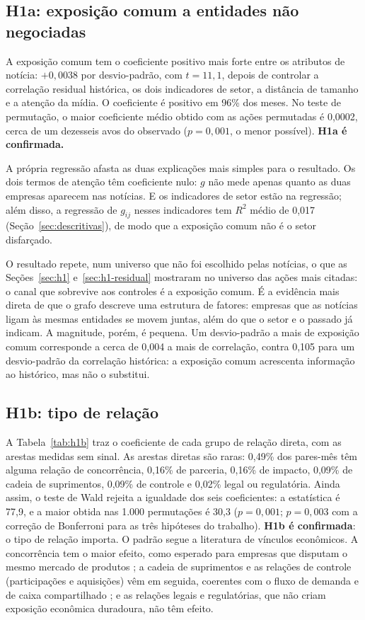 \subsection{H1a: exposição comum a entidades não negociadas}
\label{sec:h1a}

A exposição comum tem o coeficiente positivo mais forte entre os atributos de notícia: $+0{,}0038$ por
desvio-padrão, com $t=11{,}1$, depois de controlar a correlação residual histórica, os dois indicadores de
setor, a distância de tamanho e a atenção da mídia. O coeficiente é positivo em 96\% dos meses. No teste
de permutação, o maior coeficiente médio obtido com as ações permutadas é 0,0002, cerca de um dezesseis
avos do observado ($p=0{,}001$, o menor possível). \textbf{H1a é confirmada.}

A própria regressão afasta as duas explicações mais simples para o resultado. Os dois termos de atenção
têm coeficiente nulo: $g$ não mede apenas quanto as duas empresas aparecem nas notícias. E os indicadores
de setor estão na regressão; além disso, a regressão de $g_{ij}$ nesses indicadores tem $R^2$ médio de
0,017 (Seção~\ref{sec:descritivas}), de modo que a exposição comum não é o setor disfarçado.

O resultado repete, num universo que não foi escolhido pelas notícias, o que as
Seções~\ref{sec:h1} e~\ref{sec:h1-residual} mostraram no universo das ações mais citadas: o canal que
sobrevive aos controles é a exposição comum. É a evidência mais direta de que o grafo descreve uma
estrutura de fatores: empresas que as notícias ligam às mesmas entidades se movem juntas, além do que o
setor e o passado já indicam. A magnitude, porém, é pequena. Um desvio-padrão a mais de exposição comum
corresponde a cerca de 0,004 a mais de correlação, contra 0,105 para um desvio-padrão da correlação
histórica: a exposição comum acrescenta informação ao histórico, mas não o substitui.

\subsection{H1b: tipo de relação}
\label{sec:h1b}

A Tabela~\ref{tab:h1b} traz o coeficiente de cada grupo de relação direta, com as arestas medidas sem
sinal. As arestas diretas são raras: 0,49\% dos pares-mês têm alguma relação de concorrência, 0,16\% de
parceria, 0,16\% de impacto, 0,09\% de cadeia de suprimentos, 0,09\% de controle e 0,02\% legal ou
regulatória. Ainda assim, o teste de Wald rejeita a igualdade dos seis coeficientes: a estatística é
77,9, e a maior obtida nas 1.000 permutações é 30,3 ($p=0{,}001$; $p=0{,}003$ com a correção de Bonferroni
para as três hipóteses do trabalho).
\textbf{H1b é confirmada}: o tipo de relação importa. O padrão segue a literatura de vínculos econômicos.
A concorrência tem o maior efeito, como esperado para empresas que disputam o mesmo mercado de produtos
\citep{hoberg2016}; a cadeia de suprimentos e as relações de controle (participações e aquisições) vêm em
seguida, coerentes com o fluxo de demanda e de caixa compartilhado \citep{cohen2008,menzly2010}; e as
relações legais e regulatórias, que não criam exposição econômica duradoura, não têm efeito.

